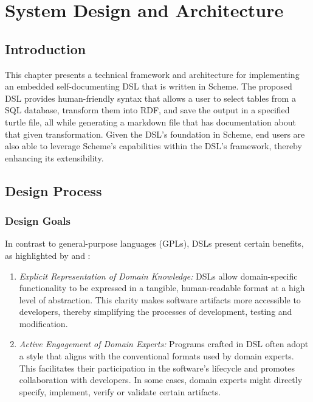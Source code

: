 \chapter{System Design and Architecture}

\section{Introduction}

This chapter presents a technical framework and architecture for implementing an embedded self-documenting DSL that is written in Scheme.  The proposed DSL provides human-friendly syntax that allows a user to select tables from a SQL database, transform them into RDF, and save the output in a specified turtle file, all while generating a markdown file that has documentation about that given transformation.  Given the DSL's foundation in Scheme, end users are also able to leverage Scheme's capabilities within the DSL's framework, thereby enhancing its extensibility.

\section{Design Process}

\subsection{Design Goals}

In contrast to general-purpose languages (GPLs), DSLs present certain benefits, as highlighted by \citet{freudenthal2010domain} and \citet{spinellis2001notable}:

\begin{enumerate}
\item \textit{Explicit Representation of Domain Knowledge:} DSLs allow domain-specific functionality to be expressed in a tangible, human-readable format at a high level of abstraction.  This clarity makes software artifacts more accessible to developers, thereby simplifying the processes of development, testing and modification.
\item \textit{Active Engagement of Domain Experts:} Programs crafted in DSL often adopt a style that aligns with the conventional formats used by domain experts.  This facilitates their participation in the software's lifecycle and promotes collaboration with developers. In some cases, domain experts might directly specify, implement, verify or validate certain artifacts.
\end{enumerate}

